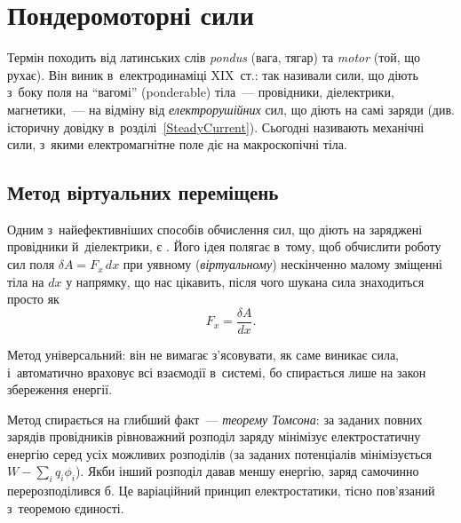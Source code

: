 \section{Пондеромоторні сили}\hypertarget{ponderomotive-forces}{}

Термін  походить від латинських слів \textit{pondus} (вага,
тягар) та \textit{motor} (той, що рухає). Він виник в~електродинаміці XIX~ст.: так
називали сили, що діють з~боку поля на \enquote{вагомі} (ponderable) тіла~--- провідники,
діелектрики, магнетики,~--- на відміну від \emph{електрорушійних} сил, що діють на самі
заряди (див. історичну довідку в~розділі~\ref{SteadyCurrent}). Сьогодні  називають механічні
сили, з~якими електромагнітне поле діє на макроскопічні тіла.



\subsection*{Метод віртуальних переміщень}



Одним з~найефективніших способів обчислення сил, що діють на заряджені провідники
й~діелектрики, є . Його ідея полягає в~тому, щоб
обчислити роботу сил поля $\delta A = F_x\, dx$ при уявному (\emph{віртуальному})
нескінченно малому зміщенні тіла на $dx$ у напрямку, що нас цікавить, після чого шукана
сила знаходиться просто як
\begin{equation*}
	F_x = \frac{\delta A}{dx}.
\end{equation*}

Метод універсальний: він не вимагає з'ясовувати, як саме виникає сила, і~автоматично
враховує всі взаємодії в~системі, бо спирається лише на закон збереження енергії.

Метод спирається на глибший факт~--- \emph{теорему Томсона}: за заданих повних зарядів
провідників рівноважний розподіл заряду мінімізує електростатичну енергію серед усіх
можливих розподілів (за заданих потенціалів мінімізується $W-\sum_i q_i\phi_i$). Якби
інший розподіл давав меншу енергію, заряд самочинно перерозподілився б. Це варіаційний
принцип електростатики, тісно пов'язаний з~теоремою єдиності.



